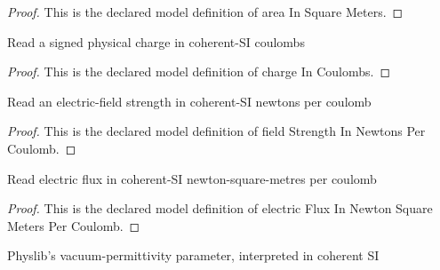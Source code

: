 \begin{proof}
  This is the declared model definition of area In Square Meters.
\end{proof}
\begin{definition}
  \label{def:physics:phyx-mini-0842:phyxminiproblems-problemphyxmini0842-chargeincoulombs}
  Read a signed physical charge in coherent-SI coulombs
\end{definition}
\begin{proof}
  This is the declared model definition of charge In Coulombs.
\end{proof}
\begin{definition}
  \label{def:physics:phyx-mini-0842:phyxminiproblems-problemphyxmini0842-fieldstrengthinnewtonspercoulomb}
  Read an electric-field strength in coherent-SI newtons per coulomb
\end{definition}
\begin{proof}
  This is the declared model definition of field Strength In Newtons Per Coulomb.
\end{proof}
\begin{definition}
  \label{def:physics:phyx-mini-0842:phyxminiproblems-problemphyxmini0842-electricfluxinnewtonsquaremeterspercoulomb}
  Read electric flux in coherent-SI newton-square-metres per coulomb
\end{definition}
\begin{proof}
  This is the declared model definition of electric Flux In Newton Square Meters Per Coulomb.
\end{proof}
\begin{definition}
  \label{def:physics:phyx-mini-0842:phyxminiproblems-problemphyxmini0842-vacuumpermittivityincoulombsquaredpernewtonsquaremeter}
  Physlib's vacuum-permittivity parameter, interpreted in coherent SI
\end{definition}
